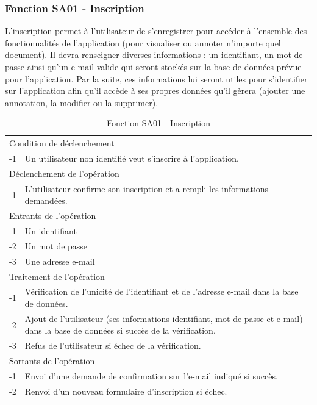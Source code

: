 \documentclass[a4paper]{article}
\begin{document}
\subsubsection{Fonction SA01 - Inscription}

L’inscription permet à l’utilisateur de s’enregistrer pour accéder à l’ensemble des fonctionnalités de l’application (pour visualiser ou annoter n’importe quel document). Il devra renseigner diverses informations : un identifiant, un mot de passe ainsi qu’un e-mail valide qui seront stockés sur la base de données prévue pour l’application. Par la suite, ces informations lui seront utiles pour s’identifier sur l’application afin qu’il accède à ses propres données qu’il gèrera (ajouter une annotation, la modifier ou la supprimer).
    
\begin{table}[H]
  \centering
   \small
	\begin{tabular}{|c|p{12cm}|}
   		\hline
   			\rowcolor{lightgray}\multicolumn{2}{|c|}{\textbf{Fonction SA01 - Inscription}} \\
   		\hline
   			\multicolumn{2}{|l|}{Condition de déclenchement} \\
   		\hline
   			-1 & Un utilisateur non identifié veut s'inscrire à l'application.\\
   		\hline
   			\multicolumn{2}{|l|}{Déclenchement de l'opération} \\
   		\hline
   			-1 & L'utilisateur confirme son inscription et a rempli les informations demandées.\\
   		\hline
   			\multicolumn{2}{|l|}{Entrants de l'opération} \\
   		\hline
   			-1 & Un identifiant\\
        	-2 & Un mot de passe\\ 
        	-3 & Une adresse e-mail\\ 
   		\hline
   			\multicolumn{2}{|l|}{Traitement de l'opération} \\
  		\hline
   			-1 & Vérification de l'unicité de l'identifiant et de l'adresse e-mail dans la base de données.\\
        	-2 & Ajout de l'utilisateur (ses informations identifiant, mot de passe et e-mail) dans la base de données si succès de la vérification.\\
        	-3 & Refus de l'utilisateur si échec de la vérification.\\
   		\hline
   			\multicolumn{2}{|l|}{Sortants de l'opération} \\
   		\hline
   			-1 & Envoi d'une demande de confirmation sur l'e-mail indiqué si succès.\\
            -2 & Renvoi d'un nouveau formulaire d'inscription si échec.\\
   		\hline
	\end{tabular}
  \caption{Fonction SA01 - Inscription}
  \normalsize
  \label{tab: inscription}
\end{table}
    
\end{document}
